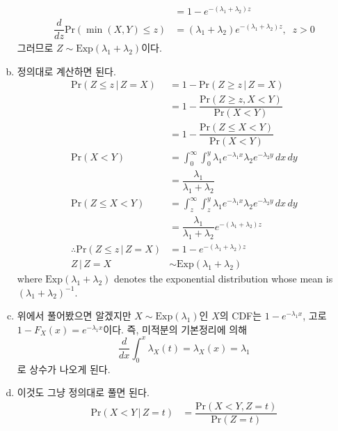 \documentclass[answers]{exam}
\begin{document}
\begin{questions}
\begin{solution}
\begin{enumerate}[(a)]
\begin{align}
        &= 1-e^{-\left(\lambda_{1}+\lambda_{2}\right)z}\\
        \dfrac{d}{dz}\mathrm{Pr}\left(\min\left(X,Y\right)\leq z\right) &= \left(\lambda_{1}+\lambda_{2}\right)e^{-\left(\lambda_{1}+\lambda_{2}\right)z}, \;\;z>0
      \end{align}
      그러므로 $Z\sim\mathrm{Exp}\left(\lambda_{1}+\lambda_{2}\right)$이다.
      \item 정의대로 계산하면 된다.
      \begin{align}
        \mathrm{Pr}\left(Z\leq z\,|\,Z=X\right)&= 1-\mathrm{Pr}\left(Z\geq z\,|\,Z=X\right)\\
        &=1-\dfrac{\mathrm{Pr}\left(Z\geq z, X<Y\right)}{\mathrm{Pr}\left(X<Y\right)}\\
        &=1-\dfrac{\mathrm{Pr}\left(Z\leq X<Y\right)}{\mathrm{Pr}\left(X<Y\right)}\\
        \mathrm{Pr}\left(X<Y\right) &= \int_{0}^{\infty}\int_{0}^{y}\lambda_{1}e^{-\lambda_{1}x}\lambda_{2}e^{-\lambda_{2}y}\,dx\,dy\\
        &= \dfrac{\lambda_{1}}{\lambda_{1}+\lambda_{2}}\\
        \mathrm{Pr}\left(Z\leq X<Y\right) &= \int_{z}^{\infty}\int_{z}^{y}\lambda_{1}e^{-\lambda_{1}x}\lambda_{2}e^{-\lambda_{2}y}\,dx\,dy\\
        &=\dfrac{\lambda_{1}}{\lambda_{1}+\lambda_{2}}e^{-\left(\lambda_{1}+\lambda_{2}\right)z}\\
        \therefore \mathrm{Pr}\left(Z\leq z\,|\,Z=X\right) &= 1-e^{-\left(\lambda_{1}+\lambda_{2}\right)z}\\
        Z\,|\,Z=X &\sim \mathrm{Exp}\left(\lambda_{1}+\lambda_{2}\right)
      \end{align}
      where $\mathrm{Exp}\left(\lambda_{1}+\lambda_{2}\right)$ denotes the exponential distribution whose mean is $\left(\lambda_{1}+\lambda_{2}\right)^{-1}$.
      \item 위에서 풀어봤으면 알겠지만 $X\sim\mathrm{Exp}\left(\lambda_{1}\right)$인 $X$의 CDF는 $1-e^{-\lambda_{1} x}$, 고로 $1-F_{X}\left(x\right)=e^{-\lambda_{1} x}$이다. 즉, 미적분의 기본정리에 의해
      \begin{equation}
      \dfrac{d}{dx}\int_{0}^{x}\lambda_{X}\left(t\right)=\lambda_{X}\left(x\right)=\lambda_{1}
      \end{equation}
      로 상수가 나오게 된다.
      \item 이것도 그냥 정의대로 풀면 된다.
      \begin{align}
        \mathrm{Pr}\left(X<Y\,|\,Z=t\right) &=\dfrac{\mathrm{Pr}\left(X<Y,Z=t\right)}{\mathrm{Pr}\left(Z=t\right)}\\

\end{align}
\end{enumerate}
\end{solution}
\end{questions}
\end{document}
